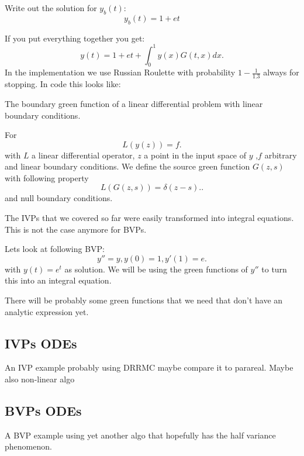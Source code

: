 \documentclass[a4paper,12pt]{article}
\begin{document}
Write out the solution for $y_{b}(t)$:
$$
    y_{b}(t) = 1 + e t
$$

If you put everything together you get:
$$
    y(t) = 1+et +\int_{0}^{1} y(x) G(t,x)dx.
$$
In the implementation we use Russian Roulette  with probability $1-\frac{1}{1.3}$ always for stopping.
In code this looks like:



\begin{definition}
    The boundary green function of a linear differential problem with linear boundary
    conditions.
\end{definition}

\begin{definition}
    For
    \[
        L(y(z)) = f
        .\]
    with $L$ a linear differential operator, $z$ a point in the input space of $y$
    ,$f$ arbitrary and linear boundary conditions.
    We define the source green function $G(z,s)$ with following property
    \[
        L(G(z,s))=\delta(z-s).
        .\]
    and null boundary conditions.
\end{definition}


The IVPs that we covered so far were easily transformed into integral equations.
This is not the case anymore for BVPs.
\begin{example}[$y''=y$]
    Lets look at following BVP:
    \begin{equation}
        y''=y, y(0)=1, y'(1)=e.
    \end{equation}
    with $y(t)= e^{t}$ as solution. We will be using
    the green functions of $y''$ to turn this into an integral equation.
\end{example}


\begin{example}
    There will be probably some green functions that we need
    that don't have an analytic expression yet.
\end{example}

\subsection{IVPs ODEs}
An IVP example probably using DRRMC maybe compare it to parareal. Maybe also non-linear algo

\subsection{BVPs ODEs}
A BVP example using yet another algo that hopefully has the half variance phenomenon.
\end{document}
